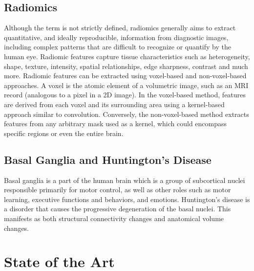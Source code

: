 \subsection{Radiomics}

Although the term is not strictly defined, radiomics generally aims to extract quantitative, and ideally reproducible, information from diagnostic images, including complex patterns that are difficult to recognize or quantify by the human eye. \cite{radio} Radiomic features capture tissue characteristics such as heterogeneity, shape, texture, intensity, spatial relationships, edge sharpness, contrast and much more. \cite{radio2} Radiomic features can be extracted using voxel-based and non-voxel-based approaches. A voxel is the atomic element of a volumetric image, such as an MRI record (analogous to a pixel in a 2D image). In the voxel-based method, features are derived from each voxel and its surrounding area using a kernel-based approach similar to convolution. Conversely, the non-voxel-based method extracts features from any arbitrary mask used as a kernel, which could encompass specific regions or even the entire brain.

\subsection{Basal Ganglia and Huntington’s Disease}

Basal ganglia is a part of the human brain which is a group of subcortical nuclei responsible primarily for motor control, as well as other roles such as motor learning, executive functions and behaviors, and emotions. \cite{basal} Huntington’s disease is a disorder that causes the progressive degeneration of the basal nuclei. \cite{hunting} This manifests as both structural connectivity changes and anatomical volume changes. \cite{basal2}\par

\section{State of the Art}


